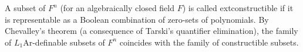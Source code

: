 A subset of $F^n$ (for an algebraically closed field $F$) is called 	ext{constructible} if it is representable as a Boolean combination of zero-sets of polynomials. By Chevalley's theorem (a consequence of Tarski's quantifier elimination), the family of $L_1\mathrm{Ar}$-definable subsets of $F^n$ coincides with the family of constructible subsets.
